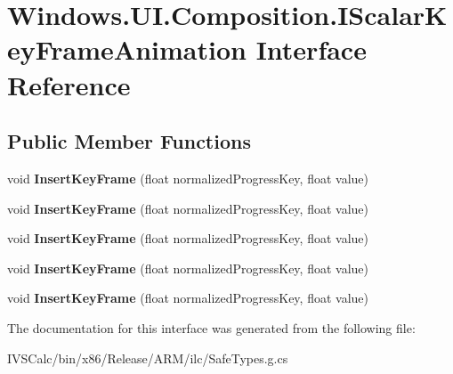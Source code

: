 \hypertarget{interface_windows_1_1_u_i_1_1_composition_1_1_i_scalar_key_frame_animation}{}\section{Windows.\+U\+I.\+Composition.\+I\+Scalar\+Key\+Frame\+Animation Interface Reference}
\label{interface_windows_1_1_u_i_1_1_composition_1_1_i_scalar_key_frame_animation}
\subsection*{Public Member Functions}
\begin{DoxyCompactItemize}
\item 
\mbox{\label{interface_windows_1_1_u_i_1_1_composition_1_1_i_scalar_key_frame_animation_a1b346c30f389972e4f08dce00f4c65cf}} 
void {\bfseries Insert\+Key\+Frame} (float normalized\+Progress\+Key, float value)
\item 
\mbox{\label{interface_windows_1_1_u_i_1_1_composition_1_1_i_scalar_key_frame_animation_a1b346c30f389972e4f08dce00f4c65cf}} 
void {\bfseries Insert\+Key\+Frame} (float normalized\+Progress\+Key, float value)
\item 
\mbox{\label{interface_windows_1_1_u_i_1_1_composition_1_1_i_scalar_key_frame_animation_a1b346c30f389972e4f08dce00f4c65cf}} 
void {\bfseries Insert\+Key\+Frame} (float normalized\+Progress\+Key, float value)
\item 
\mbox{\label{interface_windows_1_1_u_i_1_1_composition_1_1_i_scalar_key_frame_animation_a1b346c30f389972e4f08dce00f4c65cf}} 
void {\bfseries Insert\+Key\+Frame} (float normalized\+Progress\+Key, float value)
\item 
\mbox{\label{interface_windows_1_1_u_i_1_1_composition_1_1_i_scalar_key_frame_animation_a1b346c30f389972e4f08dce00f4c65cf}} 
void {\bfseries Insert\+Key\+Frame} (float normalized\+Progress\+Key, float value)
\end{DoxyCompactItemize}


The documentation for this interface was generated from the following file\+:\begin{DoxyCompactItemize}
\item 
I\+V\+S\+Calc/bin/x86/\+Release/\+A\+R\+M/ilc/Safe\+Types.\+g.\+cs\end{DoxyCompactItemize}
